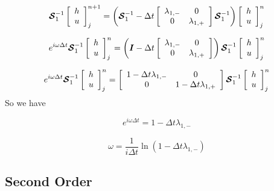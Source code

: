 \documentclass[12pt]{article}
\begin{document}
\[\boldsymbol{\mathcal{S}}_1^{-1}\left[\begin{array}{c}
h \\ u
\end{array}\right]^{n+1}_j = \left(\boldsymbol{\mathcal{S}}_1^{-1} - \Delta t \left[\begin{array}{c c}
\lambda_{1,-}  & 0 \\0  & \lambda_{1,+}
\end{array}\right] \boldsymbol{\mathcal{S}}_1^{-1} \right)\left[\begin{array}{c}
h \\ u
\end{array}\right]^{n}_j  \]

\[e^{i \omega \Delta t}\boldsymbol{\mathcal{S}}_1^{-1}\left[\begin{array}{c}
h \\ u
\end{array}\right]^{n}_j = \left(\boldsymbol{I}- \Delta t \left[\begin{array}{c c}
\lambda_{1,-}  & 0 \\0  & \lambda_{1,+}
\end{array}\right] \right) \boldsymbol{\mathcal{S}}_1^{-1}\left[\begin{array}{c}
h \\ u
\end{array}\right]^{n}_j  \]

\[e^{i \omega \Delta t}\boldsymbol{\mathcal{S}}_1^{-1}\left[\begin{array}{c}
h \\ u
\end{array}\right]^{n}_j = \left[\begin{array}{c c}
1 - \Delta t\lambda_{1,-}  & 0 \\0  & 1- \Delta t\lambda_{1,+}
\end{array}\right] \boldsymbol{\mathcal{S}}_1^{-1}\left[\begin{array}{c}
h \\ u
\end{array}\right]^{n}_j  \]
So we have

\[e^{i\omega\Delta t} = 1 - \Delta t\lambda_{1,-}\]

\[\omega = \frac{1}{i \Delta t} \ln \left(1 - \Delta t\lambda_{1,-}\right) \]

\subsection{Second Order}
\end{document}
